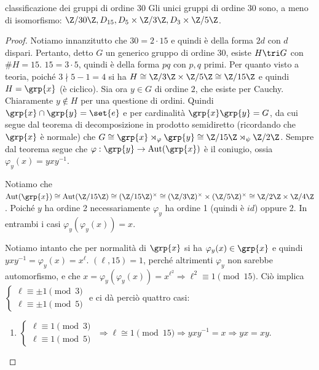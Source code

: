 \begin{example2}{classificazione dei gruppi di ordine 30}
    Gli unici gruppi di ordine $30$ sono, a meno di isomorfismo: $\Z/30\Z, D_{15}, D_5 \times \Z/3\Z,  D_3 \times \Z/5\Z$.
\end{example2}
\begin{proof}
    Notiamo innanzitutto che $30 = 2\cdot15$ e quindi è della forma $2d$ con $d$ dispari. Pertanto, detto $G$ un generico gruppo di ordine 30, esiste $H \tri G$ con $\#H = 15$. $15 = 3 \cdot 5$, quindi è della forma $pq$ con $p,q$ primi. Per quanto visto a teoria, poiché $3 \nmid 5-1 = 4$ si ha $H \cong \Z/3\Z \times \Z/5\Z \cong\Z/15\Z$ e quindi $H = \grp{x}$ (è ciclico). Sia ora $y \in G$ di ordine $2$, che esiste per Cauchy. Chiaramente $y \not \in H$ per una questione di ordini. Quindi $\grp{x}\cap\grp{y} = \set{e}$ e per cardinalità $\grp{x}\grp{y} = G$, da cui segue dal teorema di decomposizione in prodotto semidiretto (ricordando che $\grp{x}$ è normale) che $G \cong \grp{x} \rtimes_{\varphi} \grp{y} \cong  \Z/15\Z \rtimes_{\psi} \Z /2\Z$. Sempre dal teorema segue che  $\varphi: \grp{y} \rightarrow \text{Aut}(\grp{x})$ è il coniugio, ossia $\varphi_y(x) = yxy^{-1}$.
    
    Notiamo che $\text{Aut}(\grp{x}) \cong \text{Aut}(\Z/15\Z) \cong (\Z/15\Z)^\times \cong (\Z/3\Z)^\times \times (\Z/5\Z)^\times \cong \Z/2\Z \times \Z/4\Z$. Poiché $y$ ha ordine 2 necessariamente $\varphi_y$ ha ordine 1 (quindi è $id$) oppure 2. In entrambi i casi $\varphi_y(\varphi_y(x)) = x$.
    
    Notiamo intanto che per normalità di $\grp{x}$ si ha $\varphi_y(x) \in \grp{x}$ e quindi $yxy^{-1} = \varphi_y(x) = x^{\ell}$.
    $(\ell,15) = 1$, perché altrimenti $\varphi_y$ non sarebbe automorfismo, e che $x = \varphi_y(\varphi_y(x)) = x^{\ell^2} \Rightarrow \ell^2 \equiv 1 \pmod{15}$. Ciò implica
    $\begin{cases}
    \ell \equiv \pm 1 \pmod{3} \\
    \ell \equiv \pm 1 \pmod{5} 
    \end{cases}$
    e ci dà perciò quattro casi: 
    \begin{enumerate}
        \item
        $\begin{cases}
        \ell \equiv  1 \pmod{3} \\
        \ell \equiv  1 \pmod{5} 
        \end{cases}$ $\Rightarrow \ell \cong 1 \pmod{15} \Rightarrow yxy^{-1} = x \Rightarrow yx = xy$.
        

\end{enumerate}
\end{proof}
